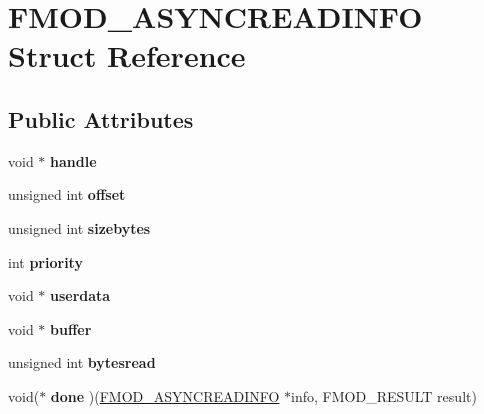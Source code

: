 \hypertarget{struct_f_m_o_d___a_s_y_n_c_r_e_a_d_i_n_f_o}{\section{F\+M\+O\+D\+\_\+\+A\+S\+Y\+N\+C\+R\+E\+A\+D\+I\+N\+F\+O Struct Reference}
\label{struct_f_m_o_d___a_s_y_n_c_r_e_a_d_i_n_f_o}
}
\subsection*{Public Attributes}
\begin{DoxyCompactItemize}
\item 
\hypertarget{struct_f_m_o_d___a_s_y_n_c_r_e_a_d_i_n_f_o_a3d4c5ed32198fbfc04301f3d23f25f36}{void $\ast$ {\bfseries handle}}\label{struct_f_m_o_d___a_s_y_n_c_r_e_a_d_i_n_f_o_a3d4c5ed32198fbfc04301f3d23f25f36}

\item 
\hypertarget{struct_f_m_o_d___a_s_y_n_c_r_e_a_d_i_n_f_o_a8d42cc77cd8ef0559a666038e02a8807}{unsigned int {\bfseries offset}}\label{struct_f_m_o_d___a_s_y_n_c_r_e_a_d_i_n_f_o_a8d42cc77cd8ef0559a666038e02a8807}

\item 
\hypertarget{struct_f_m_o_d___a_s_y_n_c_r_e_a_d_i_n_f_o_a19cda62a563d8b9c3116411c13d207f6}{unsigned int {\bfseries sizebytes}}\label{struct_f_m_o_d___a_s_y_n_c_r_e_a_d_i_n_f_o_a19cda62a563d8b9c3116411c13d207f6}

\item 
\hypertarget{struct_f_m_o_d___a_s_y_n_c_r_e_a_d_i_n_f_o_aae5a4b76307bec7a0132b3abb04ab823}{int {\bfseries priority}}\label{struct_f_m_o_d___a_s_y_n_c_r_e_a_d_i_n_f_o_aae5a4b76307bec7a0132b3abb04ab823}

\item 
\hypertarget{struct_f_m_o_d___a_s_y_n_c_r_e_a_d_i_n_f_o_a5354f411977bfd939a4eff8484a3cf22}{void $\ast$ {\bfseries userdata}}\label{struct_f_m_o_d___a_s_y_n_c_r_e_a_d_i_n_f_o_a5354f411977bfd939a4eff8484a3cf22}

\item 
\hypertarget{struct_f_m_o_d___a_s_y_n_c_r_e_a_d_i_n_f_o_a5c34e1bc9be84ed5d8d3a6722cb30df6}{void $\ast$ {\bfseries buffer}}\label{struct_f_m_o_d___a_s_y_n_c_r_e_a_d_i_n_f_o_a5c34e1bc9be84ed5d8d3a6722cb30df6}

\item 
\hypertarget{struct_f_m_o_d___a_s_y_n_c_r_e_a_d_i_n_f_o_acef1543320ee49d5c723ce1dbd58e43b}{unsigned int {\bfseries bytesread}}\label{struct_f_m_o_d___a_s_y_n_c_r_e_a_d_i_n_f_o_acef1543320ee49d5c723ce1dbd58e43b}

\item 
\hypertarget{struct_f_m_o_d___a_s_y_n_c_r_e_a_d_i_n_f_o_abdc7b446a71b1c6a45503e9caf1eface}{void($\ast$ {\bfseries done} )(\hyperlink{struct_f_m_o_d___a_s_y_n_c_r_e_a_d_i_n_f_o}{F\+M\+O\+D\+\_\+\+A\+S\+Y\+N\+C\+R\+E\+A\+D\+I\+N\+F\+O} $\ast$info, F\+M\+O\+D\+\_\+\+R\+E\+S\+U\+L\+T result)}\label{struct_f_m_o_d___a_s_y_n_c_r_e_a_d_i_n_f_o_abdc7b446a71b1c6a45503e9caf1eface}

\end{DoxyCompactItemize}


